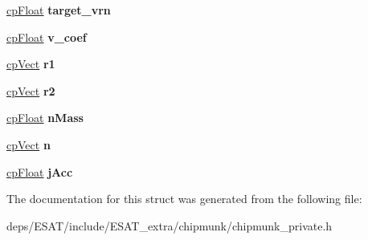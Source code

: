 \begin{DoxyCompactItemize}
\mbox{\label{structcp_damped_spring_ae52d9c75dc9d5014c384144de1bb6055}} 
\mbox{\hyperlink{group__basic_types_gac1ed65573e035bf892505768c852d8d3}{cp\+Float}} {\bfseries target\+\_\+vrn}
\item 
\mbox{\label{structcp_damped_spring_a75975322d892c943d987d214a7d9ea48}} 
\mbox{\hyperlink{group__basic_types_gac1ed65573e035bf892505768c852d8d3}{cp\+Float}} {\bfseries v\+\_\+coef}
\item 
\mbox{\label{structcp_damped_spring_ab43b3ecbd18b7aadde8714805ab19cff}} 
\mbox{\hyperlink{structcp_vect}{cp\+Vect}} {\bfseries r1}
\item 
\mbox{\label{structcp_damped_spring_a0dd22a669019cfa056e74b4f748c41b7}} 
\mbox{\hyperlink{structcp_vect}{cp\+Vect}} {\bfseries r2}
\item 
\mbox{\label{structcp_damped_spring_a7345162bd8d559fca663af2263ce262f}} 
\mbox{\hyperlink{group__basic_types_gac1ed65573e035bf892505768c852d8d3}{cp\+Float}} {\bfseries n\+Mass}
\item 
\mbox{\label{structcp_damped_spring_acc3698e3f3252f62917a2554f0edf69f}} 
\mbox{\hyperlink{structcp_vect}{cp\+Vect}} {\bfseries n}
\item 
\mbox{\label{structcp_damped_spring_ab747cd9a7a810442486286138edb7abe}} 
\mbox{\hyperlink{group__basic_types_gac1ed65573e035bf892505768c852d8d3}{cp\+Float}} {\bfseries j\+Acc}
\end{DoxyCompactItemize}


The documentation for this struct was generated from the following file\+:\begin{DoxyCompactItemize}
\item 
deps/\+E\+S\+A\+T/include/\+E\+S\+A\+T\+\_\+extra/chipmunk/chipmunk\+\_\+private.\+h\end{DoxyCompactItemize}

